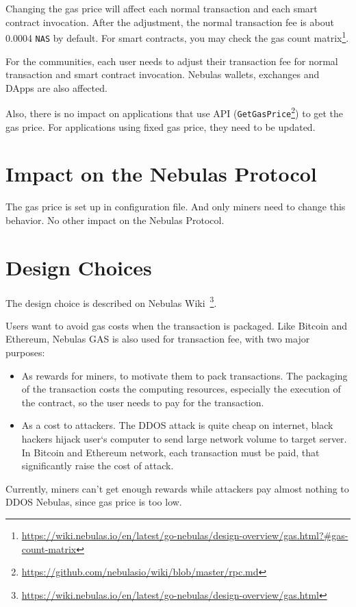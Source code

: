 \documentclass[11pt]{article}
\begin{document}
Changing the gas price will affect each normal transaction and each smart contract invocation.
After the adjustment, the normal transaction fee is about 0.0004 \texttt{NAS}
by default. For smart contracts, you may check the gas count
matrix\footnote{\url{https://wiki.nebulas.io/en/latest/go-nebulas/design-overview/gas.html?\#gas-count-matrix}}.

For the communities, each user needs to adjust their transaction fee for normal transaction and smart contract invocation.
Nebulas wallets, exchanges and DApps are also affected.

Also, there is no impact on applications that use API (\texttt{GetGasPrice}\footnote{\url{https://github.com/nebulasio/wiki/blob/master/rpc.md}}) to get the gas price.
For applications using fixed gas price, they need to be updated.

\section{Impact on the Nebulas Protocol}
The gas price is set up in configuration file. And only miners need to change this behavior.
No other impact on the Nebulas Protocol.

\section{Design Choices}

The design choice is described on Nebulas Wiki~\footnote{\url{https://wiki.nebulas.io/en/latest/go-nebulas/design-overview/gas.html}}.

Users want to avoid gas costs when the transaction is packaged. Like Bitcoin and Ethereum, Nebulas GAS is also used for transaction fee, with two major purposes:
\begin{itemize}
\item As rewards for miners, to motivate them to pack transactions. The packaging of the transaction costs the computing resources, especially the execution of the contract, so the user needs to pay for the transaction.
\item As a cost to attackers. The DDOS attack is quite cheap on internet, black hackers hijack user‘s computer to send large network volume to target server. In Bitcoin and Ethereum network, each transaction must be paid, that significantly raise the cost of attack.
\end{itemize}

Currently, miners can't get enough rewards while attackers pay almost nothing to DDOS Nebulas,
since gas price is too low.
\end{document}
